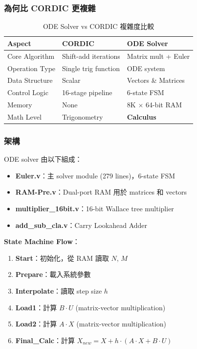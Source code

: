 \documentclass[journal]{IEEEtran}
\begin{document}
\subsubsection{為何比 CORDIC 更複雜}
\begin{table}[!t]
\centering
\caption{ODE Solver vs CORDIC 複雜度比較}
\label{tab:ode_vs_cordic}
\footnotesize
\begin{tabular}{@{}lll@{}}
\toprule
\textbf{Aspect} & \textbf{CORDIC} & \textbf{ODE Solver} \\
\midrule
Core Algorithm & Shift-add iterations & Matrix mult + Euler \\
Operation Type & Single trig function & ODE system \\
Data Structure & Scalar & Vectors \& Matrices \\
Control Logic & 16-stage pipeline & 6-state FSM \\
Memory & None & 8K $\times$ 64-bit RAM \\
Math Level & Trigonometry & \textbf{Calculus} \\
\bottomrule
\end{tabular}
\end{table}

\subsubsection{架構}
ODE solver 由以下組成：
\begin{itemize}
    \item \textbf{Euler.v}：主 solver module (279 lines)，6-state FSM
    \item \textbf{RAM-Pre.v}：Dual-port RAM 用於 matrices 和 vectors
    \item \textbf{multiplier\_16bit.v}：16-bit Wallace tree multiplier
    \item \textbf{add\_sub\_cla.v}：Carry Lookahead Adder
\end{itemize}

\textbf{State Machine Flow}：
\begin{enumerate}
    \item \textbf{Start}：初始化，從 RAM 讀取 $N$, $M$
    \item \textbf{Prepare}：載入系統參數
    \item \textbf{Interpolate}：讀取 step size $h$
    \item \textbf{Load1}：計算 $B \cdot U$ (matrix-vector multiplication)
    \item \textbf{Load2}：計算 $A \cdot X$ (matrix-vector multiplication)
    \item \textbf{Final\_Calc}：計算 $X_{new} = X + h \cdot (A \cdot X + B \cdot U)$
\end{enumerate}
\end{document}
